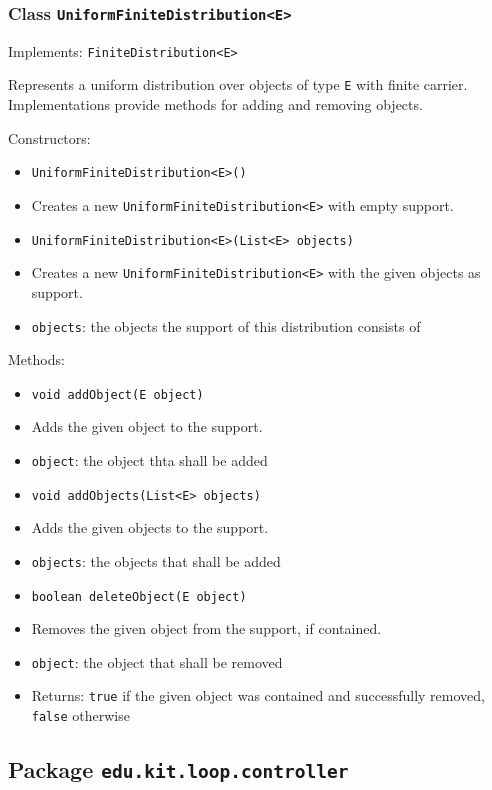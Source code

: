 \documentclass[parskip=full,11pt]{scrartcl}
\begin{document}
\subsubsection{Class \texttt{UniformFiniteDistribution<E>}}
Implements: \texttt{FiniteDistribution<E>}

Represents a uniform distribution over objects of type \texttt{E} with finite carrier. Implementations provide methods for adding and removing objects.

Constructors:
\begin{itemize}\itemsep -10pt
\item \texttt{UniformFiniteDistribution<E>()}
\item[] Creates a new \texttt{UniformFiniteDistribution<E>} with empty support.

\item \texttt{UniformFiniteDistribution<E>(List<E> objects)}
\item[] Creates a new \texttt{UniformFiniteDistribution<E>} with the given objects as support.
\item[] \texttt{objects}: the objects the support of this distribution consists of
\end{itemize}

Methods:
\begin{itemize}\itemsep -10pt
\item \texttt{void addObject(E object)}
\item[] Adds the given object to the support.
\item[] \texttt{object}: the object thta shall be added

\item \texttt{void addObjects(List<E> objects)}
\item[] Adds the given objects to the support.
\item[] \texttt{objects}: the objects that shall be added

\item \texttt{boolean deleteObject(E object)}
\item[] Removes the given object from the support, if contained.
\item[] \texttt{object}: the object that shall be removed
\item[] Returns: \texttt{true} if the given object was contained and successfully removed, \texttt{false} otherwise
\end{itemize}

\subsection{Package \texttt{edu.kit.loop.controller}}
\end{document}
